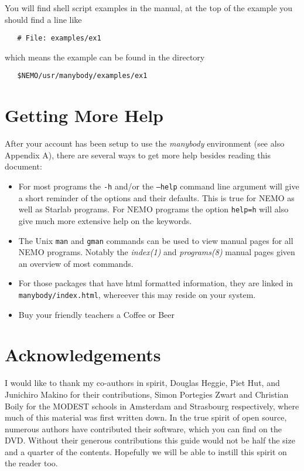 {{You will find shell script examples in the manual, at the top of the example
you should find a line like

\footnotesize\begin{verbatim}
   # File: examples/ex1
\end{verbatim}\normalsize

which means the example can be found in the directory

\footnotesize\begin{verbatim}
   $NEMO/usr/manybody/examples/ex1
\end{verbatim}\normalsize  %


\section*{Getting More Help}

After your account has been setup to use the {\it manybody} environment
(see also Appendix A), there are several ways to get more help besides
reading this document:
\begin{itemize}
\item
For most programs the {\tt -h} and/or the {\tt --help} 
command line argument will give a short
reminder of the options and their defaults. This is true for NEMO as well
as Starlab programs.
For NEMO programs the option {\tt help=h} will also give much more extensive help
on the keywords.

\item
The Unix {\tt man} and {\tt gman} commands can be used to view manual pages
for all NEMO programs. Notably the {\it index(1)} and {\it programs(8)}
manual pages given an overview of most commands.

\item
For those packages that have html formatted information, they are
linked in {\tt manybody/index.html}, whereever this may reside on your
system.

\item
Buy your friendly teachers a Coffee or Beer

\end{itemize}

\section*{Acknowledgements}

I would like to thank my co-authors in spirit, 
Douglas Heggie, Piet Hut, and Junichiro Makino for their contributions, 
Simon Portegies Zwart and Christian Boily for the MODEST schools in Amsterdam 
and Strasbourg respectively, where much of this material was first
written down.
In the true spirit of open source, 
numerous authors have contributed their software, which you can find on
the DVD. Without their generous contributions this guide would not be
half the size and a quarter of the contents.
Hopefully we will be able to instill this spirit on the reader too.



}}
